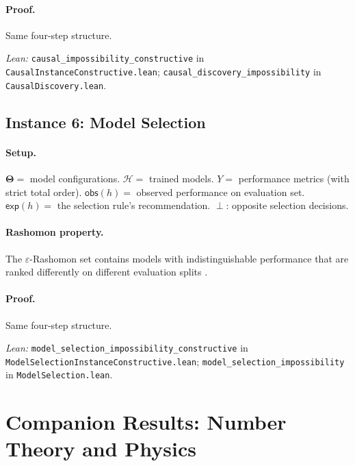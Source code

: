 \documentclass[11pt,a4paper]{article}
\newcommand{\Params}{\mathbf{\Theta}}
\newcommand{\sH}{\mathcal{H}}
\newcommand{\incomp}{\perp}
\begin{document}
\paragraph{Proof.}
Same four-step structure.

{\raggedright\noindent\textit{Lean:}
\texttt{causal\_impossibility\_constructive} in
\texttt{CausalInstanceConstructive.lean};
\texttt{causal\_discovery\_impossibility} in
\texttt{CausalDiscovery.lean}.\par}

\subsection{Instance 6: Model Selection}
\label{app:proof-model-selection}

\paragraph{Setup.}
$\Params ={}$ model configurations.
$\sH ={}$ trained models.
$Y ={}$ performance metrics (with strict total order).
$\mathsf{obs}(h) ={}$ observed performance on evaluation set.
$\mathsf{exp}(h) ={}$ the selection rule's recommendation.
$\incomp$: opposite selection decisions.

\paragraph{Rashomon property.}
The $\varepsilon$-Rashomon set contains models with indistinguishable
performance that are ranked differently on different evaluation splits
\citep{fisher2019models,rudin2024amazing,semenova2022existence}.

\paragraph{Proof.}
Same four-step structure.

{\raggedright\noindent\textit{Lean:}
\texttt{model\_selection\_impossibility\_constructive}
in \texttt{ModelSelectionInstanceConstructive.lean};
\texttt{model\_selection\_impossibility}
in \texttt{ModelSelection.lean}.\par}


\section{Companion Results: Number Theory and Physics}
\label{sec:companion-physics}
\end{document}

